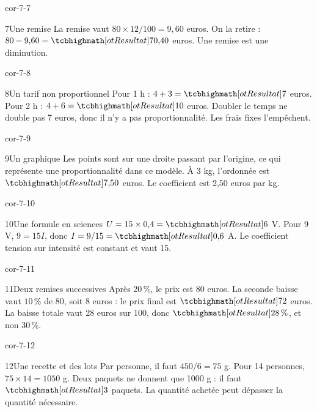 \begin{blocLivre}{cor-7-7}\begin{corrige}{7}{Une remise}
La remise vaut $80\times12/100=9{,}60$ euros. On la retire : $80-9{,}60=\res{70{,}40}$ euros. Une remise est une diminution.
\end{corrige}\end{blocLivre}
\begin{blocLivre}{cor-7-8}\begin{corrige}{8}{Un tarif non proportionnel}
Pour 1 h : $4+3=\res7$ euros. Pour 2 h : $4+6=\res{10}$ euros. Doubler le temps ne double pas 7 euros, donc il n’y a pas proportionnalité. Les frais fixes l’empêchent.
\end{corrige}\end{blocLivre}
\begin{blocLivre}{cor-7-9}\begin{corrige}{9}{Un graphique}
Les points sont sur une droite passant par l’origine, ce qui représente une proportionnalité dans ce modèle. À 3 kg, l’ordonnée est $\res{7{,}50}$ euros. Le coefficient est 2,50 euros par kg.
\label{fig-cor-7-9}
\end{corrige}\end{blocLivre}
\begin{blocLivre}{cor-7-10}\begin{corrige}{10}{Une formule en sciences}
$U=15\times0{,}4=\res6$ V. Pour 9 V, $9=15I$, donc $I=9/15=\res{0{,}6}$ A. Le coefficient tension sur intensité est constant et vaut 15.
\end{corrige}\end{blocLivre}
\begin{blocLivre}{cor-7-11}\begin{corrige}{11}{Deux remises successives}
Après 20\,\%, le prix est 80 euros. La seconde baisse vaut $10\,\%$ de 80, soit 8 euros : le prix final est $\res{72}$ euros. La baisse totale vaut 28 euros sur 100, donc $\res{28\,\%}$, et non 30\,\%.
\end{corrige}\end{blocLivre}
\begin{blocLivre}{cor-7-12}\begin{corrige}{12}{Une recette et des lots}
Par personne, il faut $450/6=75$ g. Pour 14 personnes, $75\times14=1050$ g. Deux paquets ne donnent que 1000 g : il faut $\res3$ paquets. La quantité achetée peut dépasser la quantité nécessaire.
\end{corrige}\end{blocLivre}
